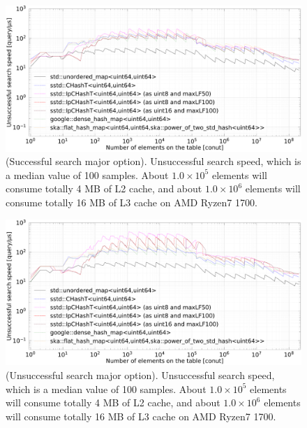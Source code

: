\begin{figure}[h]
  \hspace{-3mm}
  \includegraphics[scale=0.24]{./fig_bench_sm/find_unsuccessful_search_med.pdf}
  \caption{
    (Successful search major option). Unsuccessful search speed, which is a median value of 100 samples.
    About $1.0\times10^5$ elements will consume totally 4 MB of L2 cache,
    and about $1.0\times10^6$ elements will consume totally 16 MB of L3 cache on AMD Ryzen7 1700.
  }
  \label{fig_bench_find_us_sm}
\end{figure}

\begin{figure}[h]
  \hspace{-3mm}
  \includegraphics[scale=0.24]{./fig_bench_usm/find_unsuccessful_search_med.pdf}
  \caption{
    (Unsuccessful search major option). Unsuccessful search speed, which is a median value of 100 samples.
    About $1.0\times10^5$ elements will consume totally 4 MB of L2 cache,
    and about $1.0\times10^6$ elements will consume totally 16 MB of L3 cache on AMD Ryzen7 1700.
  }
  \label{fig_bench_find_us_um}
\end{figure}


